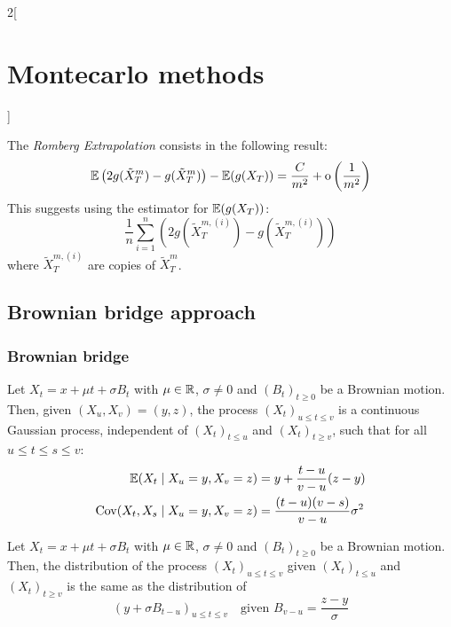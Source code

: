 \documentclass[../../../main_math.tex]{subfiles}
\begin{document}
\begin{multicols}{2}[\section{Montecarlo methods}]
\begin{remark}
  \end{remark}
  \begin{corollary}
    The \emph{Romberg Extrapolation} consists in the following result:
    $$
      \mathbb{E}\left(2g(\tilde{X}^m_T)-g(\tilde{X}^m_T)\right)-\mathbb{E}(g(X_T))= \frac{C}{m^2}+\mathrm{o}\left(\frac{1}{m^2}\right)
    $$
    This suggests using the estimator for $\mathbb{E}(g(X_T))$:
    $$
      \frac{1}{n}\sum_{i=1}^n\left(2 g(\tilde{X}^{m,(i)}_T)-g(\tilde{X}^{m,(i)}_T)\right)
    $$
    where $\tilde{X}^{m,(i)}_T$ are \iid copies of $\tilde{X}^m_T$.
  \end{corollary}
  \subsection{Brownian bridge approach}
  \subsubsection{Brownian bridge}
  \begin{proposition}
    Let $X_t=x+\mu t+\sigma B_t$ with $\mu\in \mathbb{R}$, $\sigma\ne 0$ and ${(B_t)}_{t\geq 0}$ be a Brownian motion. Then, given $(X_u,X_v)=(y,z)$, the process ${(X_t)}_{u\leq t\leq v}$ is a continuous Gaussian process, independent of ${(X_t)}_{t\leq u}$ and ${(X_t)}_{t\geq v}$, such that for all $u\leq t\leq s \leq v$:
    \begin{align*}
      \mathbb{E}(X_t\mid X_u=y, X_v=z)     & =y+\frac{t-u}{v-u}(z-y)         \\
      \mathrm{Cov}(X_t,X_s\mid X_u=y, X_v=z) & =\frac{(t-u)(v-s)}{v-u}\sigma^2
    \end{align*}
  \end{proposition}
  \begin{corollary}
    Let $X_t=x+\mu t+\sigma B_t$ with $\mu\in \mathbb{R}$, $\sigma\ne 0$ and ${(B_t)}_{t\geq 0}$ be a Brownian motion. Then, the distribution of the process ${(X_t)}_{u\leq t\leq v}$ given ${(X_t)}_{t\leq u}$ and ${(X_t)}_{t\geq v}$ is the same as the distribution of
    $$
      {(y+\sigma B_{t-u})}_{u\leq t\leq v}\quad\text{given } B_{v-u}=\frac{z-y}{\sigma}
    $$
  \end{corollary}

\end{multicols}
\end{document}

